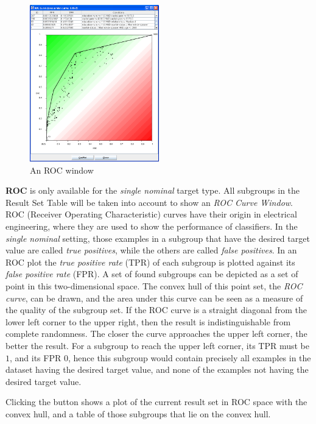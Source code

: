 \documentclass{article}
\begin{document}
\begin{figure}[t]
\begin{center}
\includegraphics[width=0.5\textwidth]{rocwindow.png}
\caption{An ROC window}
\end{center}
\label{fig:rocwindow}
\end{figure}

\textbf{ROC} is only available for the \emph{single nominal} target type. 
All subgroups in the Result Set Table will be taken into account to show an
\emph{ROC Curve Window}.  ROC (Receiver Operating Characteristic) curves
have their origin in electrical engineering, where they are used to show the
performance of classifiers.  In the \emph{single nominal} setting, those
examples in a subgroup that have the desired target value are called
\emph{true positives}, while the others are called \emph{false positives}. 
In an ROC plot the \emph{true positive rate} (TPR) of each subgroup is
plotted against its \emph{false positive rate} (FPR).  A set of found
subgroups can be depicted as a set of point in this two-dimensional space. 
The convex hull of this point set, the \emph{ROC curve}, can be drawn, and
the area under this curve can be seen as a measure of the quality of the
subgroup set.  If the ROC curve is a straight diagonal from the lower left
corner to the upper right, then the result is indistinguishable from
complete randomness.  The closer the curve approaches the upper left corner,
the better the result.  For a subgroup to reach the upper left corner, its
TPR must be $1$, and its FPR $0$, hence this subgroup would contain
precisely all examples in the dataset having the desired target value, and
none of the examples not having the desired target value.

Clicking the button shows a plot of the current result set in ROC space with
the convex hull, and a table of those subgroups that lie on the convex hull.
\end{document}
